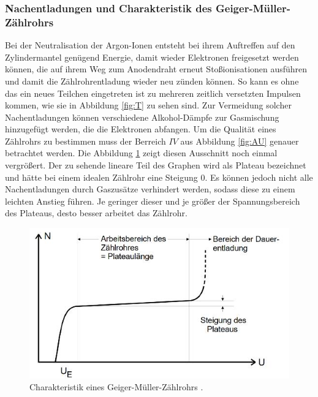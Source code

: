 \subsubsection{Nachentladungen und Charakteristik des Geiger-Müller-Zählrohrs}
Bei der Neutralisation der Argon-Ionen entsteht bei ihrem Auftreffen auf den Zylindermantel genügend Energie, damit wieder Elektronen freigesetzt werden können, die auf ihrem Weg zum Anodendraht erneut Stoßionisationen ausführen und damit die Zählrohrentladung wieder neu zünden können.
So kann es ohne das ein neues Teilchen eingetreten ist zu mehreren zeitlich versetzten Impulsen kommen, wie sie in Abbildung \ref{fig:T} zu sehen sind. Zur Vermeidung solcher Nachentladungen können verschiedene Alkohol-Dämpfe zur Gasmischung hinzugefügt werden, die die Elektronen abfangen.\newline
Um die Qualität eines Zählrohrs zu bestimmen muss der Berreich $IV$ aus Abbildung \ref{fig:AU} genauer betrachtet werden. Die Abbildung \ref{fig:AU2} zeigt diesen Ausschnitt noch einmal vergrößert.
Der zu sehende lineare Teil des Graphen wird als Plateau bezeichnet und hätte bei einem idealen Zählrohr eine Steigung 0.
Es können jedoch nicht alle Nachentladungen durch Gaszusätze verhindert werden, sodass diese zu einem leichten Anstieg führen.
Je geringer dieser und je größer der Spannungsbereich des Plateaus, desto besser arbeitet das Zählrohr.

\begin{figure}
\centering
\includegraphics[scale=0.5]{content/images/AU2.jpg}
\caption{Charakteristik eines Geiger-Müller-Zählrohrs \cite{V703}.}
\label{fig:AU2}
\end{figure}


